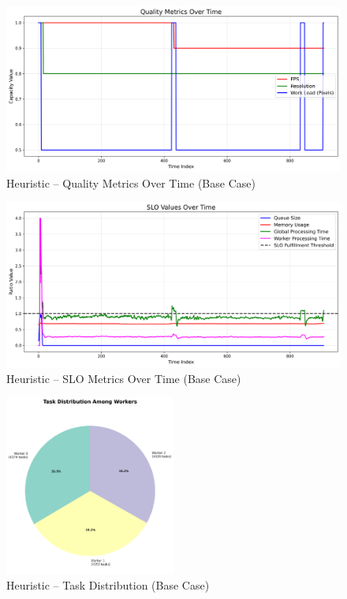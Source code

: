 \begin{figure}[h]
    \centering
    \includegraphics[width=\textwidth]{img/results/basic_sim/heuristic_quality_metrics.png}
    \caption{Heuristic – Quality Metrics Over Time (Base Case)}
\end{figure}
\begin{figure}[h]
    \centering
    \includegraphics[width=\textwidth]{img/results/basic_sim/heuristic_slo_values.png}
    \caption{Heuristic – SLO Metrics Over Time (Base Case)}
\end{figure}
\begin{figure}[h]
    \centering
    \includegraphics[width=0.5\textwidth]{img/results/basic_sim/heuristic_task_distribution_pie.png}
    \caption{Heuristic – Task Distribution (Base Case)}
\end{figure}

